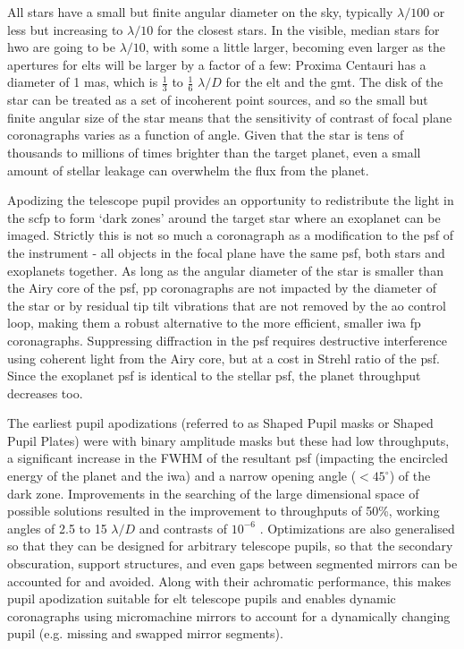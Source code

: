 \documentclass[letterpaper]{ar-1col}
\newcommand{\ld}{$\lambda/D$}
\begin{document}
All stars have a small but finite angular diameter on the sky, typically $\lambda/100$ or less but increasing to $\lambda/10$ for the closest stars.
In the visible, median stars for \ac{hwo} are going to be $\lambda/10$, with some a little larger, becoming even larger as the apertures for \acp{elt} will be larger by a factor of a few: Proxima Centauri has a diameter of 1 mas, which is $\frac{1}{3}$ to $\frac{1}{6}$ \ld{} for the \ac{elt} and the \ac{gmt}.
%
The disk of the star can be treated as a set of incoherent point sources, and so the small but finite angular size of the star means that the sensitivity of contrast of focal plane coronagraphs varies as a function of angle.
%
Given that the star is tens of thousands to millions of times brighter than the target planet, even a small amount of stellar leakage can overwhelm the flux from the planet.


Apodizing the telescope pupil provides an opportunity to redistribute the light in the \ac{scfp} to form `dark zones' around the target star where an exoplanet can be imaged.
%
Strictly this is not so much a coronagraph as a modification to the \ac{psf} of the instrument - all objects in the focal plane have the same \ac{psf}, both stars and exoplanets together.
%
As long as the angular diameter of the star is smaller than the Airy core of the \ac{psf}, \ac{pp} coronagraphs are not impacted by the diameter of the star or by residual tip tilt vibrations that are not removed by the \ac{ao} control loop, making them a robust alternative to the more efficient, smaller \ac{iwa} \ac{fp} coronagraphs. 
%
Suppressing diffraction in the \ac{psf} requires destructive interference using coherent light from the Airy core, but at a cost in Strehl ratio of the \ac{psf}.
%
Since the exoplanet \ac{psf} is identical to the stellar \ac{psf}, the planet throughput decreases too.

The earliest pupil apodizations (referred to as Shaped Pupil masks or Shaped Pupil Plates) were with binary amplitude masks \citep{Jacquinot64,Kasdin05} but these had low throughputs, a significant increase in the FWHM of the resultant \ac{psf} (impacting the encircled energy of the planet and the \ac{iwa}) and a narrow opening angle ($<45^\circ$) of the dark zone.
% 
Improvements in the searching of the large dimensional space of possible solutions resulted in the improvement to throughputs of 50\%, working angles of 2.5 to 15 \ld{} and contrasts of $10^{-6}$ \citep{Carlotti11}.
%
Optimizations are also generalised so that they can be designed for arbitrary telescope pupils, so that the secondary obscuration, support structures, and even gaps between segmented mirrors can be accounted for and avoided.
%
Along with their achromatic performance, this makes pupil apodization  suitable for \ac{elt} telescope pupils and enables dynamic coronagraphs using micromachine mirrors \citep{Leboulleux22b,Carlotti23} to account for a dynamically changing pupil (e.g. missing and swapped mirror segments).
\end{document}
